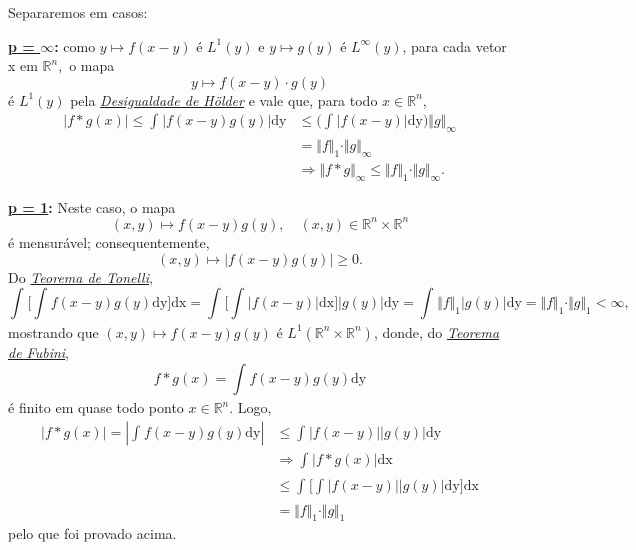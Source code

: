 \documentclass[../distribution_theory_notes.tex]{subfiles}
\begin{document}
\begin{proof*}
	Separaremos em casos:

	\textbf{\underline{p = \(\infty\)}:} como \(y\mapsto f(x-y)\) é \(L^{1}(y)\) e \(y\mapsto g(y)\) é \(L^{\infty}(y)\), para cada vetor x em \(\mathbb{R}^{n},\) o mapa
	\[
		y\mapsto f(x-y)\cdot g(y)
	\]
	é \(L^{1}(y)\) pela \hyperlink{holder_inequality}{\textit{Desigualdade de Hölder}} e vale que, para todo \(x\in \mathbb{R}^{n}\),
	\begin{align*}
		|f*g(x)|\leq \int_{}^{}|f(x-y)g(y)| \mathrm{dy} & \leq \biggl(\int_{}^{}|f(x-y)| \mathrm{dy}\biggr) \Vert g \Vert_{\infty}               \\
		                                                & =\Vert f \Vert_1 \cdot \Vert g \Vert_{\infty}                                          \\
		                                                & \Rightarrow \Vert f*g \Vert_{\infty}\leq \Vert f \Vert_1 \cdot \Vert g \Vert_{\infty}.
	\end{align*}

	\textbf{\underline{p = 1}:} Neste caso, o mapa
	\[
		(x, y)\mapsto f(x-y)g(y),\quad (x, y)\in \mathbb{R}^{n}\times \mathbb{R}^{n}
	\]
	é mensurável; consequentemente,
	\[
		(x, y)\mapsto |f(x-y)g(y)| \geq 0.
	\]
	Do \hyperlink{fubini_tonelli}{\textit{Teorema de Tonelli}},
	\[
		\int_{}^{}\biggl[\int_{}^{}f(x-y)g(y) \mathrm{dy}\biggr] \mathrm{dx}=\int_{}^{}\biggl[\int_{}^{}|f(x-y)| \mathrm{dx} \biggr]|g(y)| \mathrm{dy}= \int_{}^{}\Vert f \Vert_1 |g(y)| \mathrm{dy} = \Vert f \Vert_1 \cdot \Vert g \Vert_1 <\infty,
	\]
	mostrando que \((x, y)\mapsto f(x-y)g(y)\) é \(L^{1}(\mathbb{R}^{n}\times \mathbb{R}^{n})\), donde, do \hyperlink{fubini_tonelli}{\textit{Teorema de Fubini}},
	\[
		f*g(x)=\int_{}^{}f(x-y)g(y) \mathrm{dy}
	\]
	é finito em quase todo ponto \(x\in \mathbb{R}^{n}.\) Logo,
	\begin{align*}
		|f*g(x)| = |\int_{}^{}f(x-y)g(y) \mathrm{dy}| & \leq \int_{}^{}|f(x-y)||g(y)| \mathrm{dy}                                     \\
		                                              & \Rightarrow \int_{}^{}|f*g(x)| \mathrm{dx}                                    \\
		                                              & \leq \int_{}^{}\biggl[\int_{}^{}|f(x-y)||g(y)| \mathrm{dy}\biggr] \mathrm{dx} \\
		                                              & = \Vert f \Vert_1 \cdot \Vert g \Vert_1
	\end{align*}
	pelo que foi provado acima.


\end{proof*}
\end{document}
